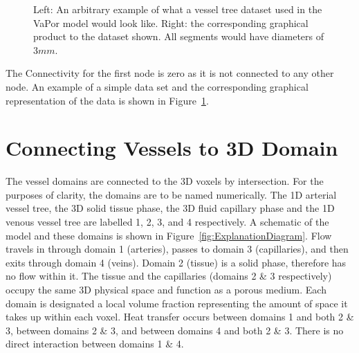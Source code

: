 \documentclass[11pt,english,a4paper,twoside,openright]{report}
\begin{document}
{{{{{{{{\begin{figure}
	\caption[An arbitrary example of a vessel tree dataset with corresponding graphical output]{Left: An arbitrary example of what a vessel tree dataset used in the VaPor model would look like. Right: the corresponding graphical product to the dataset shown. All segments would have diameters of $3mm$.}		
	\label{fig:VesselPlot1}
\end{figure}

The Connectivity for the first node is zero as it is not connected to any other node. An example of a simple data set and the corresponding graphical representation of the data is shown in Figure~\ref{fig:VesselPlot1}.

\section[Connecting Vessels to 3D Domain]{{\Large C}onnecting {\Large V}essels to {\Large 3D} {\Large D}omain}
\label{Sec:3ConnectingVesselsto3dDomain}

The vessel domains are connected to the 3D voxels by intersection. For the purposes of clarity, the domains are to be named numerically. The 1D arterial vessel tree, the 3D solid tissue phase, the 3D fluid capillary phase and the 1D venous vessel tree are labelled 1, 2, 3, and 4 respectively. A schematic of the model and these domains is shown in Figure~\ref{fig:ExplanationDiagram}. Flow travels in through domain 1 (arteries), passes to domain 3 (capillaries), and then exits through domain 4 (veins). Domain 2 (tissue) is a solid phase, therefore has no flow within it. The tissue and the capillaries (domains 2 \& 3 respectively) occupy the same 3D physical space and function as a porous medium. Each domain is designated a local volume fraction representing the amount of space it takes up within each voxel. Heat transfer occurs between domains 1 and both 2 \& 3, between domains 2 \& 3, and between domains 4 and both 2 \& 3. There is no direct interaction between domains 1 \& 4. 

}}}}}}}}
\end{document}
